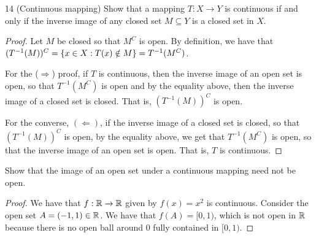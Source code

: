\begin{exercise}{14 (Continuous mapping)} Show that a mapping $T:X\to Y$ is continuous if and only if the inverse image of any closed set $M\subseteq Y$ is a closed set in $X$.
\end{exercise}
\begin{proof}
Let $M$ be closed so that $M^C$ is open. By definition, we have that $(T^{-1}(M))^C=\{x\in X:T(x)\notin M\}=T^{-1}(M^C)$. 

For the ($\Rightarrow$) proof, if $T$ is continuous, then the inverse image of an open set is open, so that $T^{-1}(M^C)$ is open and by the equality above, then the inverse image of a closed set is closed. That is, $(T^{-1}(M))^C$ is open. 

For the converse, $(\Leftarrow)$, if the inverse image of a closed set is closed, so that $(T^{-1}(M))^C$ is open, by the equality above, we get that $T^{-1}(M^C)$ is open, so that the inverse image of an open set is open. That is, $T$ is continuous.
\end{proof}

\begin{exercise}{15}
Show that the image of an open set under a continuous mapping need not be open.
\end{exercise}
\begin{proof}
We have that $f:\mathbb{R}\to\mathbb{R}$ given by $f(x)=x^2$ is continuous. Consider the open set $A=(-1,1)\in\mathbb{R}$. We have that $f(A)=[0,1)$, which is not open in $\mathbb{R}$ because there is no open ball around 0 fully contained in $[0,1)$.
\end{proof}
